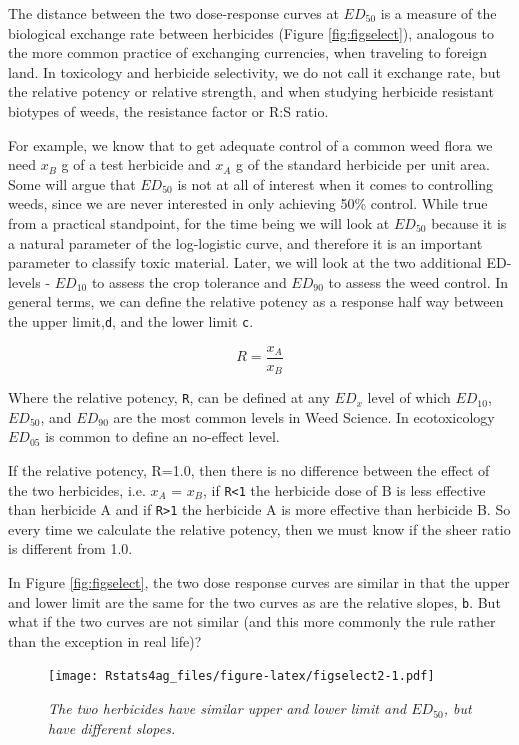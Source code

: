 \documentclass[letterpaper,]{book}
\begin{document}
The distance between the two dose-response curves at \(ED_{50}\) is a measure of the biological exchange rate between herbicides (Figure \ref{fig:figselect}), analogous to the more common practice of exchanging currencies, when traveling to foreign land. In toxicology and herbicide selectivity, we do not call it exchange rate, but the relative potency or relative strength, and when studying herbicide resistant biotypes of weeds, the resistance factor or R:S ratio.

For example, we know that to get adequate control of a common weed flora we need \(x_{B}\) g of a test herbicide and \(x_{A}\) g of the standard herbicide per unit area. Some will argue that \(ED_{50}\) is not at all of interest when it comes to controlling weeds, since we are never interested in only achieving 50\% control. While true from a practical standpoint, for the time being we will look at \(ED_{50}\) because it is a natural parameter of the log-logistic curve, and therefore it is an important parameter to classify toxic material. Later, we will look at the two additional ED-levels - \(ED_{10}\) to assess the crop tolerance and \(ED_{90}\) to assess the weed control. In general terms, we can define the relative potency as a response half way between the upper limit,\texttt{d}, and the lower limit \texttt{c}.

\[ R=\frac{x_{A}}{x_{B}} \]

Where the relative potency, \texttt{R}, can be defined at any \(ED_{x}\) level of which \(ED_{10}\), \(ED_{50}\), and \(ED_{90}\) are the most common levels in Weed Science. In ecotoxicology \(ED_{05}\) is common to define an no-effect level.

If the relative potency, R=1.0, then there is no difference between the effect of the two herbicides, i.e. \(x_{A}\) = \(x_{B}\), if \texttt{R\textless{}1} the herbicide dose of B is less effective than herbicide A and if \texttt{R\textgreater{}1} the herbicide A is more effective than herbicide B. So every time we calculate the relative potency, then we must know if the sheer ratio is different from 1.0.

In Figure \ref{fig:figselect}, the two dose response curves are similar in that the upper and lower limit are the same for the two curves as are the relative slopes, \texttt{b}. But what if the two curves are not similar (and this more commonly the rule rather than the exception in real life)?



\begin{figure}
\centering
\texttt{[image: Rstats4ag\_files/figure-latex/figselect2-1.pdf]}
\caption{\label{fig:figselect2}\emph{The two herbicides have similar upper and lower limit and \(ED_{50}\), but have different slopes.}}
\end{figure}
\end{document}
